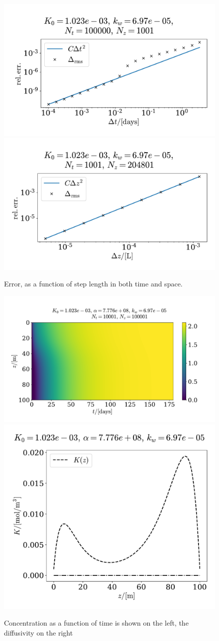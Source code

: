 \documentclass{article}
\begin{document}
    \begin{figure}
        \centering
        \includegraphics[width=.49\textwidth]{../plots/prob2_conv_test_t}
        \includegraphics[width=.49\textwidth]{../plots/prob2_conv_test_z}
        \caption{Error, as a function of step length in both time and space.}
        \label{prob2 conv}
    \end{figure}


    \begin{figure}
        \centering
        \includegraphics[width=.65\textwidth]{../plots/prob2}
        \includegraphics[width=.3\textwidth]{../plots/prob2_K}
        \caption{Concentration as a function of time is shown on the left, the diffusivity on the right}
        \label{prob2}
    \end{figure}
\end{document}
